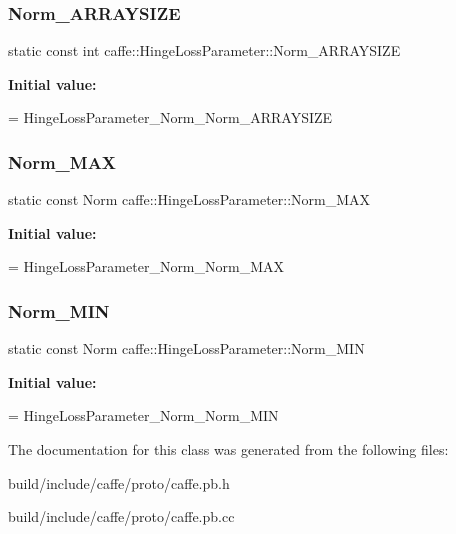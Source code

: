 \subsubsection{\texorpdfstring{Norm\+\_\+\+A\+R\+R\+A\+Y\+S\+I\+ZE}{Norm\_ARRAYSIZE}}
{\footnotesize\ttfamily static const int caffe\+::\+Hinge\+Loss\+Parameter\+::\+Norm\+\_\+\+A\+R\+R\+A\+Y\+S\+I\+ZE\hspace{0.3cm}{\ttfamily [static]}}

{\bfseries Initial value\+:}
\begin{DoxyCode}
=
    HingeLossParameter\_Norm\_Norm\_ARRAYSIZE
\end{DoxyCode}
\mbox{\label{classcaffe_1_1_hinge_loss_parameter_ac0b974facf6de5b0b08a61307dd34afe}} 
\subsubsection{\texorpdfstring{Norm\+\_\+\+M\+AX}{Norm\_MAX}}
{\footnotesize\ttfamily static const Norm caffe\+::\+Hinge\+Loss\+Parameter\+::\+Norm\+\_\+\+M\+AX\hspace{0.3cm}{\ttfamily [static]}}

{\bfseries Initial value\+:}
\begin{DoxyCode}
=
    HingeLossParameter\_Norm\_Norm\_MAX
\end{DoxyCode}
\mbox{\label{classcaffe_1_1_hinge_loss_parameter_a03311e7ed63c141373b0aae0030b7a3c}} 
\subsubsection{\texorpdfstring{Norm\+\_\+\+M\+IN}{Norm\_MIN}}
{\footnotesize\ttfamily static const Norm caffe\+::\+Hinge\+Loss\+Parameter\+::\+Norm\+\_\+\+M\+IN\hspace{0.3cm}{\ttfamily [static]}}

{\bfseries Initial value\+:}
\begin{DoxyCode}
=
    HingeLossParameter\_Norm\_Norm\_MIN
\end{DoxyCode}


The documentation for this class was generated from the following files\+:\begin{DoxyCompactItemize}
\item 
build/include/caffe/proto/caffe.\+pb.\+h\item 
build/include/caffe/proto/caffe.\+pb.\+cc\end{DoxyCompactItemize}
